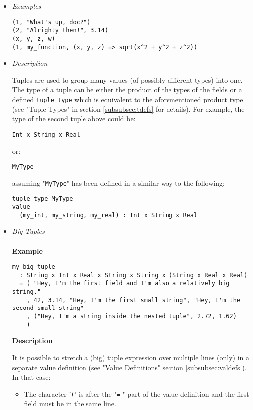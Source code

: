 \documentclass[diploma]{softlab-thesis}
\begin{document}
\begin{itemize}

\item \textit{Examples}
\begin{verbatim}
(1, "What's up, doc?")
(2, "Alrighty then!", 3.14)
(x, y, z, w)
(1, my_function, (x, y, z) => sqrt(x^2 + y^2 + z^2))
\end{verbatim}

\item \textit{Description}

Tuples are used to group many values (of possibly different types) into one.
The type of a tuple can be either the product of the types of the fields or a
defined \verb|tuple_type| which is equivalent to the aforementioned product
type (see "Tuple Types" in section \ref{subsubsec:tdefs} for details). For
example, the type of the second tuple above could be:
\begin{verbatim}
Int x String x Real
\end{verbatim}
or:
\begin{verbatim}
MyType
\end{verbatim}
assuming "\verb|MyType|" has been defined in a similar way to the following:
\begin{verbatim}
tuple_type MyType
value
  (my_int, my_string, my_real) : Int x String x Real
\end{verbatim}

\newpage
\item \textit{Big Tuples}
\\\\
\textbf{Example}
\begin{verbatim}
my_big_tuple
  : String x Int x Real x String x String x (String x Real x Real)
  = ( "Hey, I'm the first field and I'm also a relatively big string."
    , 42, 3.14, "Hey, I'm the first small string", "Hey, I'm the second small string"
    , ("Hey, I'm a string inside the nested tuple", 2.72, 1.62)
    )
\end{verbatim}

\textbf{Description}

It is possible to stretch a (big) tuple expression over multiple lines (only)
in a separate value definition (see "Value Definitions" section
\ref{subsubsec:valdefs}).  In that case:
\begin{itemize}
\item
The character '\verb|(|' is after the "\verb|=| " part of the value definition
and the first field must be in the same line.


\end{itemize}
\end{itemize}
\end{document}
